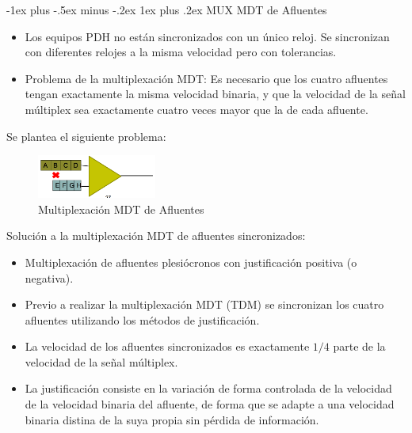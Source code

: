 \documentclass[10pt,portrait, twocolumn]{article}
\makeatletter
\renewcommand{\subsubsection}{\@startsection{subsubsection}{3}{0mm}%
                                {-1ex plus -.5ex minus -.2ex}%
                                {1ex plus .2ex}%
                                {\normalfont\small\bfseries}}
\makeatother
\begin{document}
\subsubsection{MUX MDT de Afluentes}

\begin{itemize}
\item Los equipos PDH no están sincronizados con un único reloj. Se sincronizan con diferentes relojes a la misma velocidad pero con tolerancias.
\item Problema de la multiplexación MDT: Es necesario que los cuatro afluentes tengan exactamente la misma velocidad binaria, y que la velocidad de la señal múltiplex sea exactamente cuatro veces mayor que la de cada afluente.
\end{itemize}

Se plantea el siguiente problema:

\begin{figure}[!ht]
	\centering
     \includegraphics[width=0.35\textwidth]{Problemas}
      \caption{Multiplexación MDT de Afluentes}
      \label{fig:Regiones de frecuencias}
  \end{figure}
  

Solución a la multiplexación MDT de afluentes sincronizados:

	\begin{itemize}
	\item Multiplexación de afluentes plesiócronos con justificación positiva (o negativa).
	\item Previo a realizar la multiplexación MDT (TDM) se sincronizan los cuatro afluentes utilizando los métodos de justificación.
	\item La velocidad de los afluentes sincronizados es exactamente $1/4$ parte de la velocidad de la señal múltiplex.
	\item La justificación consiste en la variación de forma controlada de la velocidad de la velocidad binaria del afluente, de forma que se adapte a una velocidad binaria distina de la suya propia sin pérdida de información.
	\end{itemize}

\end{document}
